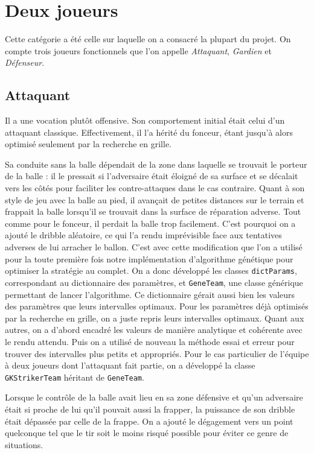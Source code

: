 \documentclass[12pt,a4paper]{article}
\begin{document}
\section{Deux joueurs}
Cette cat\'egorie a \'et\'e celle sur laquelle on a consacr\'e la plupart du 
projet. On compte trois joueurs fonctionnels que l'on appelle 
{\itshape Attaquant}, {\itshape Gardien} et {\itshape D\'efenseur}. 

\subsection*{Attaquant}
Il a une vocation plut\^ot offensive. Son comportement initial \'etait celui 
d'un attaquant classique. Effectivement, il l'a h\'erit\'e du fonceur, \'etant 
jusqu'\`a alors optimis\'e seulement par la recherche en grille.

Sa conduite sans la balle d\'ependait de la zone dans laquelle se trouvait le 
porteur de la balle : il le pressait si l'adversaire \'etait \'eloign\'e de sa 
surface et se d\'ecalait vers les c\^ot\'es pour faciliter les contre-attaques 
dans le cas contraire. 
Quant \`a son style de jeu avec la balle au pied, il avan\c{c}ait de petites 
distances sur le terrain et frappait la balle lorsqu'il se trouvait dans la 
surface de r\'eparation adverse. Tout comme pour le fonceur, il perdait la balle 
trop facilement. 
C'est pourquoi on a ajout\'e le dribble al\'eatoire, ce qui l'a rendu 
impr\'evisible face aux tentatives adverses de lui arracher le ballon. C'est 
avec cette modification que l'on a utilis\'e pour la toute premi\`ere fois 
notre impl\'ementation d'algorithme g\'en\'etique pour optimiser la strat\'egie 
au complet. On a donc d\'evelopp\'e les classes \texttt{dictParams}, 
correspondant au dictionnaire des param\`etres, et \texttt{GeneTeam}, une 
classe g\'en\'erique permettant de lancer l'algorithme. 
Ce dictionnaire g\'erait aussi bien les valeurs des param\`etres que 
leurs intervalles optimaux. Pour les param\`etres d\'ej\`a optimis\'es par la 
recherche en grille, on a juste repris leurs intervalles optimaux. Quant aux 
autres, on a d'abord encadr\'e les valeurs de mani\`ere analytique et 
coh\'erente avec le rendu attendu. Puis on a utilis\'e de nouveau la m\'ethode 
essai et erreur pour trouver des intervalles plus petits et appropri\'es.
Pour le cas particulier de l'\'equipe \`a deux joueurs dont l'attaquant fait 
partie, on a d\'evelopp\'e la classe \texttt{GKStrikerTeam} h\'eritant de 
\texttt{GeneTeam}.

Lorsque le contr\^ole de la balle avait lieu en sa zone d\'efensive et qu'un 
adversaire \'etait si proche de lui qu'il pouvait aussi la frapper, la 
puissance de son dribble \'etait d\'epass\'ee par celle de la frappe. On a 
ajout\'e le d\'egagement vers un point quelconque tel que le tir soit le moins 
risqu\'e possible pour \'eviter ce genre de situations.
\end{document}
